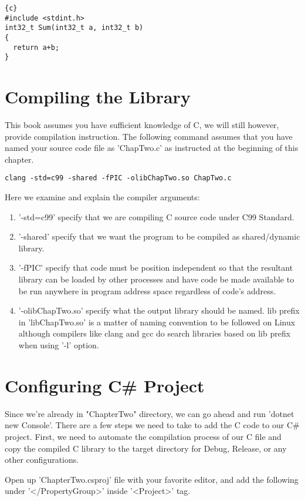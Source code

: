 \begin{lstlisting}{c}
#include <stdint.h>
int32_t Sum(int32_t a, int32_t b)
{
  return a+b;
}
\end{lstlisting}

\section{Compiling the Library}
This book assumes you have sufficient knowledge of C, we will still however, provide compilation instruction. The following command assumes that you have named your source code file as 'ChapTwo.c' as instructed at the beginning of this chapter.

\begin{lstlisting}
clang -std=c99 -shared -fPIC -olibChapTwo.so ChapTwo.c
\end{lstlisting}

Here we examine and explain the compiler arguments:

\begin{enumerate}
	\item '-std=c99' specify that we are compiling C source code under C99 Standard.
	\item '-shared' specify that we want the program to be compiled as shared/dynamic library.
	\item '-fPIC' specify that code must be position independent so that the resultant library can be loaded by other processes and have code be made available to be run anywhere in program address space regardless of code's address.
	\item '-olibChapTwo.so' specify what the output library should be named. lib prefix in 'libChapTwo.so' is a matter of naming convention to be followed on Linux although compilers like clang and gcc do search libraries based on lib prefix when using '-l' option. 
\end{enumerate}
\newpage
\section{Configuring C\# Project}
Since we're already in "ChapterTwo" directory, we can go ahead and run 'dotnet new Console'. There are a few steps we need to take to add the C code to our C\# project. First, we need to automate the compilation process of our C file and copy the compiled C library to the target directory for Debug, Release, or any other configurations.

Open up 'ChapterTwo.csproj' file with your favorite editor, and add the following under '</PropertyGroup>' inside '<Project>' tag.

